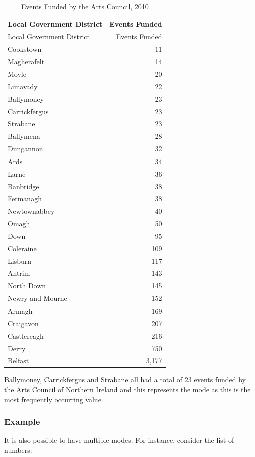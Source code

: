 \documentclass[
]{book}
\begin{document}
\begin{longtable}[]{@{}lr@{}}
\caption{\label{tab:table194} Events Funded by the Arts Council, 2010}\tabularnewline
\toprule
Local Government District & Events Funded \\
\midrule
\endfirsthead
\toprule
Local Government District & Events Funded \\
\midrule
\endhead
Cookstown & 11 \\
Magherafelt & 14 \\
Moyle & 20 \\
Limavady & 22 \\
Ballymoney & 23 \\
Carrickfergus & 23 \\
Strabane & 23 \\
Ballymena & 28 \\
Dungannon & 32 \\
Ards & 34 \\
Larne & 36 \\
Banbridge & 38 \\
Fermanagh & 38 \\
Newtownabbey & 40 \\
Omagh & 50 \\
Down & 95 \\
Coleraine & 109 \\
Lisburn & 117 \\
Antrim & 143 \\
North Down & 145 \\
Newry and Mourne & 152 \\
Armagh & 169 \\
Craigavon & 207 \\
Castlereagh & 216 \\
Derry & 750 \\
Belfast & 3,177 \\
\bottomrule
\end{longtable}

Ballymoney, Carrickfergus and Strabane all had a total of 23 events funded by the Arts Council of Northern Ireland and this represents the mode as this is the most frequently occurring value.

\hypertarget{example-4}{%
\subsubsection{Example}\label{example-4}}

It is also possible to have multiple modes. For instance, consider the list of numbers:
\end{document}
